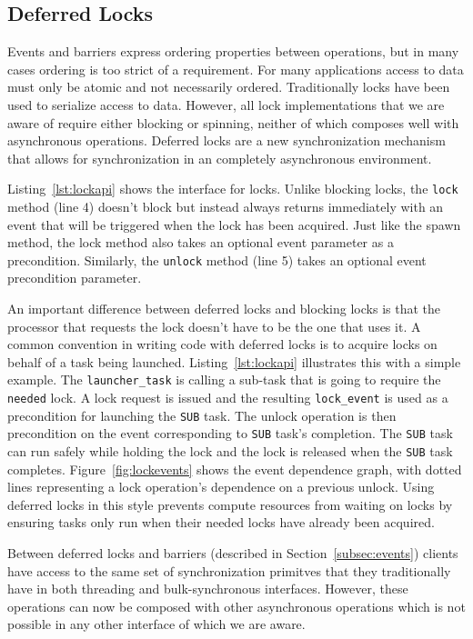 \subsection{Deferred Locks}
\label{subsec:locks}

Events and barriers express ordering properties between operations, but in many
cases ordering is too strict of a requirement.  For many applications access to data must only be atomic and
not necessarily ordered.  Traditionally locks have been used to serialize access to
data.  However, all lock implementations that we are aware of require either blocking
or spinning, neither of which composes well with asynchronous operations.
Deferred locks are a new synchronization mechanism that allows for synchronization
in an completely asynchronous environment.  

Listing~\ref{lst:lockapi} shows the 
interface for locks.  Unlike blocking locks, the {\tt lock} method (line 4) doesn't
block but instead always returns immediately with an event that will be triggered
when the lock has been acquired.  Just like the spawn method, the lock method also 
takes an optional event parameter as a precondition.  Similarly, the {\tt unlock} 
method (line 5) takes an optional event precondition parameter.

An important difference between deferred locks and blocking locks is that the processor
that requests the lock doesn't have to be the one that uses it.  A common
convention in writing code with deferred locks is to acquire locks on behalf of a task being
launched.  Listing~\ref{lst:lockapi} illustrates this with a simple example.  The
{\tt launcher\_task} is calling a sub-task that is going to require the {\tt needed}
lock.  A lock request is issued and the resulting {\tt lock\_event} is used as
a precondition for launching the {\tt SUB} task.  The unlock operation is then
precondition on the event corresponding to {\tt SUB} task's completion.  The
{\tt SUB} task can run safely while holding the lock and the lock is released when the
{\tt SUB} task completes.  Figure~\ref{fig:lockevents} shows the event dependence graph, with
dotted lines representing a lock operation's dependence on a previous unlock.
Using deferred locks in this style prevents 
compute resources from waiting on locks by ensuring tasks only run when their needed
locks have already been acquired.

Between deferred locks and barriers (described in Section~\ref{subsec:events}) clients 
have access to the same set of synchronization primitves that they traditionally have
in both threading and bulk-synchronous interfaces.  However, these operations can now 
be composed with other asynchronous operations which is not possible in any other interface
of which we are aware.

